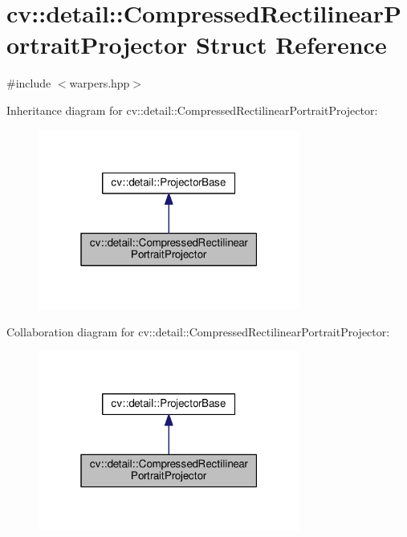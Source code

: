 \hypertarget{structcv_1_1detail_1_1CompressedRectilinearPortraitProjector}{\section{cv\-:\-:detail\-:\-:Compressed\-Rectilinear\-Portrait\-Projector Struct Reference}
\label{structcv_1_1detail_1_1CompressedRectilinearPortraitProjector}
}


{\ttfamily \#include $<$warpers.\-hpp$>$}



Inheritance diagram for cv\-:\-:detail\-:\-:Compressed\-Rectilinear\-Portrait\-Projector\-:\nopagebreak
\begin{figure}[H]
\begin{center}
\leavevmode
\includegraphics[width=244pt]{structcv_1_1detail_1_1CompressedRectilinearPortraitProjector__inherit__graph}
\end{center}
\end{figure}


Collaboration diagram for cv\-:\-:detail\-:\-:Compressed\-Rectilinear\-Portrait\-Projector\-:\nopagebreak
\begin{figure}[H]
\begin{center}
\leavevmode
\includegraphics[width=244pt]{structcv_1_1detail_1_1CompressedRectilinearPortraitProjector__coll__graph}
\end{center}
\end{figure}
